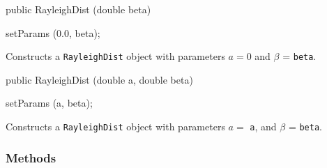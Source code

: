 \begin{code}

   public RayleighDist (double beta)\begin{hide} {
      setParams (0.0, beta);
   }\end{hide}
\end{code}
 \begin{tabb} Constructs a \texttt{RayleighDist} object with parameters
    $a = 0$ and $\beta$ = \texttt{beta}.
 \end{tabb}
\begin{code}

   public RayleighDist (double a, double beta)\begin{hide} {
      setParams (a, beta);
   }\end{hide}
\end{code}
\begin{tabb} Constructs a \texttt{RayleighDist} object with parameters
     $a =$ \texttt{a}, and $\beta$ = \texttt{beta}.
 \end{tabb}

\subsubsection* {Methods}

